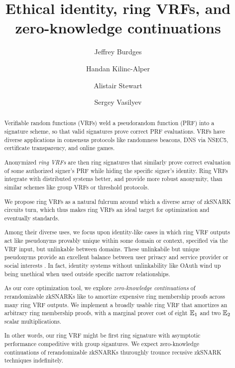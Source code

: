 \documentclass[runningheads,evcountsame,a4paper,11pt,orivec]{llncs}
\title{Ethical identity, ring VRFs, and zero-knowledge continuations}
\author{Jeffrey Burdges \and Handan Kilinc-Alper \and Alistair Stewart \and Sergey Vasilyev}
\date{}
\institute{Web 3.0 Foundation}
\begin{document}
	
\maketitle

\begin{abstract}
Verifiable random functions (VRFs) weld a pseudorandom function (PRF) into
a signature scheme, so that valid signatures prove correct PRF evaluations.
VRFs have diverse applications in consensus protocols like randomness
beacons, DNS via NSEC5, certificate transparency, and online games.

Anonymized {\em ring VRFs} are then ring signatures that similarly prove
correct evaluation of some authorized signer's PRF while hiding the
specific signer's identity.
Ring VRFs integrate with distributed systems better, and provide more robust
anonymity, than similar schemes like group VRFs or threshold protocols.


We propose ring VRFs as a natural fulcrum around which a diverse array of
zkSNARK circuits turn, which thus makes ring VRFs an ideal target
for optimization and eventually standards. 

%

Among their diverse uses, we focus upon identity-like cases in which
ring VRF outputs act like pseudonyms provably unique within some domain or
context, specified via the VRF input, but unlinkable between domains. 
These unlinkabile but unique pseudonyms provide an excellent balance between
user privacy and service provider or social interests \cite{pop2008}.
%
In fact, identity systems without unlinkability like OAuth wind up being
unethical when used outside specific narrow relationships.

%

As our core optimization tool, we explore {\em zero-knowledge continuations}
of rerandomizable zkSNARKs like \cite{groth16} to amortize expensive
ring membership proofs across many ring VRF outputs. 
%
We implement a broadly usable ring VRF that amortizes an arbitrary
ring membership proofs, with a marginal prover cost
 of eight ${\mathbb{E}}_1$ and two ${\mathbb{E}}_2$ scalar multiplications.

In other words, our ring VRF might be first ring signature with asymptotic
performance compeditive with group sigantures.
%
We expect zero-knowledge continuations of rerandomizable zkSNARKs
thuroughly trounce recusive zkSNARK techniques indefinitely.
\end{abstract}



% 














\end{document}
